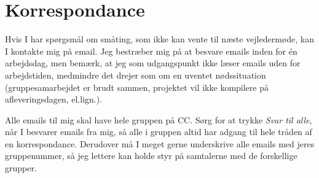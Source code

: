 \documentclass[12pt,a4paper,oneside,final]{article}
\begin{document}
\section{Korrespondance}
Hvis I har spørgsmål om småting, som ikke kan vente til næste vejledermøde, kan I kontakte mig på email.
Jeg bestræber mig på at besvare emails inden for \'en arbejdsdag, men bemærk, at jeg som udgangspunkt ikke læser emails uden for arbejdstiden, medmindre det drejer som om en uventet nødssituation (gruppesamarbejdet er brudt sammen, projektet vil ikke kompilere på afleveringsdagen, el.lign.).

Alle emails til mig skal have hele gruppen på CC.
Sørg for at trykke \emph{Svar til alle}, når I besvarer emails fra mig, så alle i gruppen altid har adgang til hele tråden af en korrespondance.
Derudover må I meget gerne underskrive alle emails med jeres gruppenummer, så jeg lettere kan holde styr på samtalerne med de forskellige grupper.
\end{document}

